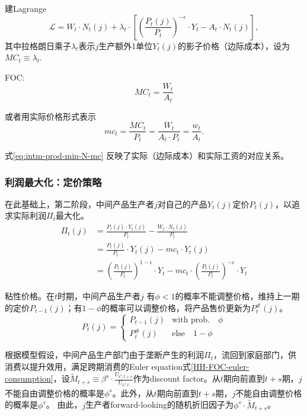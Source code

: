 建Lagrange
\begin{equation*}
  \mathcal{L} = W_t \cdot N_t(j) + \lambda_t \cdot \left[
\left(\frac{P_t(j)}{P_t}\right)^{-\epsilon} \cdot Y_t - A_t \cdot N_t(j)
\right],
\end{equation*}
其中拉格朗日乘子$\lambda_t$表示$j$生产额外1单位$Y_t(j)$的影子价格（边际成本），设为$MC_t \equiv \lambda_t $.

FOC:
\begin{equation*}
  MC_t = \frac{W_t}{A_t}
\end{equation*}

或者用实际价格形式表示
\begin{equation}
  \label{eq:intm-prod-min-N-mc}
    mc_t = \frac{MC_t}{P_t} = \frac{W_t}{A_t \cdot P_t} = \frac{w_t}{A_t}.
\end{equation}

式\eqref{eq:intm-prod-min-N-mc}  反映了实际（边际成本）和实际工资的对应关系。

\subsubsection{利润最大化：定价策略}
\label{sec:intm-max-profit}
在此基础上，第二阶段，中间产品生产者$j$对自己的产品$Y_t(j)$定价$P_t(j)$，以追求实际利润$\Pi_t$最大化。
\begin{equation}
  \label{eq:intm-prod-profit}
  \begin{split}
    \Pi_t(j) &= \frac{P_t(j) \cdot Y_t(j)}{P_t} - \frac{W_t \cdot N_t(j)}{P_t} \\
    &=\frac{P_t(j)}{P_t} \cdot Y_t(j) - mc_t \cdot Y_t(j) \\
    &=\left( \frac{P_t(j)}{P_t}\right)^{1-\epsilon} \cdot Y_t - mc_t \cdot \left( \frac{P_t(j)}{P_t}\right)^{-\epsilon} \cdot Y_t
  \end{split}
\end{equation}

粘性价格。在$t$时期，中间产品生产者$j$ 有$\phi<1$的概率不能调整价格，维持上一期的定价$P_{t-1}(j)$；有$1-\phi$的概率可以调整价格，将产品售价更新为$P_t^{\#}(j)$。
\begin{equation}
  \label{eq:intm-stick-prices}
  P_t(j) =
  \begin{cases} P_{t-1}(j) &\mbox{with prob.} \quad \phi \\
    P_t^{\#}(j) & \mbox{else} \quad 1-\phi
\end{cases}
\end{equation}

根据模型假设，中间产品生产部门由于垄断产生的利润$\Pi_t$，流回到家庭部门，供消费以提升效用，满足跨期消费的Euler equation式\eqref{HH-FOC-euler-consumption}，设$\tilde{M}_{t+s} \equiv \beta^s \cdot \frac{U_{C,t+s}}{U_{C,t}}$作为discount factor。从$t$期向前直到$t+s$期，$j$不能自由调整价格的概率是$\phi^s$。此外，从$t$期向前直到$t+s$期，$j$不能自由调整价格的概率是$\phi^s$。
由此，$j$生产者forward-looking的随机折旧因子为$\phi^s \cdot \tilde{M}_{t+s}$。

